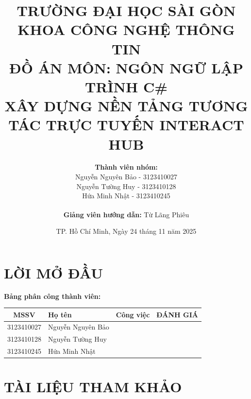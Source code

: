 \documentclass[12pt,a4paper]{report}
\title{
    \Large \textbf{TRƯỜNG ĐẠI HỌC SÀI GÒN} \\
    \large \textbf{KHOA CÔNG NGHỆ THÔNG TIN} \\
    \vspace{2cm}
    \LARGE \textbf{ĐỒ ÁN MÔN: NGÔN NGỮ LẬP TRÌNH C\#} \\
    \vspace{1cm}
    \huge \textbf{XÂY DỰNG NỀN TẢNG TƯƠNG TÁC TRỰC TUYẾN INTERACT HUB} \\
    \vspace{2cm}
}
\author{
    \textbf{Thành viên nhóm:}\\
    Nguyễn Nguyên Bảo - 3123410027 \\
    Nguyễn Tường Huy - 3123410128 \\
    Hứa Minh Nhật - 3123410245 \\
    \vspace{1cm} \\
    \textbf{Giảng viên hướng dẫn:} Từ Lãng Phiêu
}
\date{TP. Hồ Chí Minh, Ngày 24 tháng 11 năm 2025}
\begin{document}
\maketitle

\chapter*{LỜI MỞ ĐẦU}

\textbf{Bảng phân công thành viên:}

\vspace{0.5cm}
\begin{center}
\begin{tabular}{|c|l|p{6cm}|c|}
\hline
\textbf{MSSV} & \textbf{Họ tên} & \textbf{Công việc} & \textbf{ĐÁNH GIÁ} \\
\hline
3123410027 & Nguyễn Nguyên Bảo & & \\
\hline
3123410128 & Nguyễn Tường Huy & & \\
\hline
3123410245 & Hứa Minh Nhật & & \\
\hline
\end{tabular}
\end{center}

\tableofcontents
\newpage


\newpage


\newpage


\newpage


\newpage


\newpage


\newpage

\chapter*{TÀI LIỆU THAM KHẢO}
\end{document}
